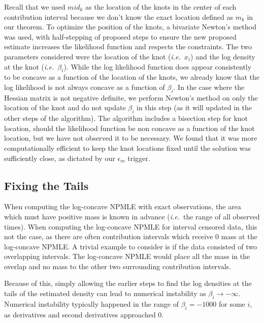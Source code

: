 	Recall that we used $mid_k$ as the location of the knots in the center of each contribution interval because we don't know the exact location defined as $m_k$ in our theorem. To optimize the position of the knots, a bivariate Newton's method was used, with half-stepping of proposed steps to ensure the new proposed estimate increases the likelihood function and respects the constraints. The two parameters considered were the location of the knot (\emph{i.e.}\ $x_i$) and the log density at the knot (\emph{i.e.}\ $\beta_i$). While the log likelihood function does appear consistently to be concave as a function of the location of the knots, we already know that the log likelihood is not always concave as a function of $\beta_i$. In the case where the Hessian matrix is not negative definite, we  perform Newton's method on only the location of the knot and do not update $\beta_i$ in this step (as it will updated in the other steps of the algorithm). The algorithm includes a bisection step for knot location, should the likelihood function be non concave as a function of the knot location, but we have not observed it to be necessary.	We found that it was more computationally efficient to keep the knot locations fixed until the solution was sufficiently close, as dictated by our $\epsilon_m$ trigger. 
		\\
		{\subsection{Fixing the Tails} }
	
	When computing the log-concave NPMLE with exact observations, the area which must have positive mass is known in advance (\emph{i.e.}\ the range of all observed times). When computing the log-concave NPMLE for interval censored data, this not the case, as there are often contribution intervals which receive 0 mass at the log-concave NPMLE. A trivial example to consider is if the data consisted of two overlapping intervals. The log-concave NPMLE would place all the mass in the overlap and no mass to the other two surrounding contribution intervals.%
	 		
	Because of this, simply allowing the earlier steps to find the log densities	 at the tails of the estimated density can lead to numerical instability as $\beta_i \rightarrow -\infty$. Numerical instability typically happened in the range of $\beta_i = -1000$ for some $i$, as derivatives and second derivatives approached 0.%
	
